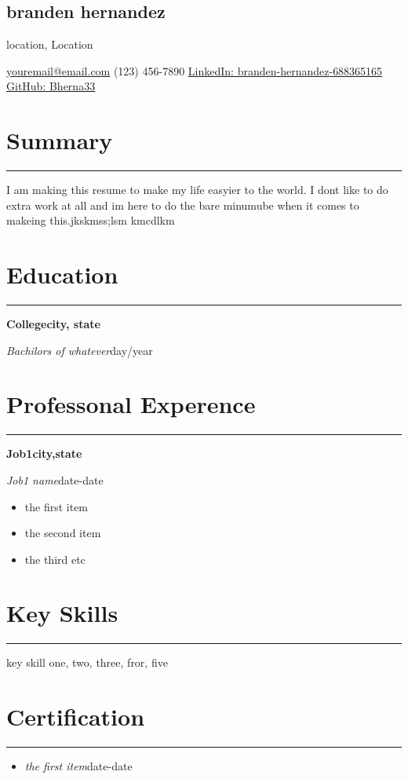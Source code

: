 \documentclass[11pt]{article}%
\begin{document}
%
\normalsize%
%
\setlength\parindent{9pt}%
%
\renewcommand\labelitemi{{-}}%
\pagestyle{empty}%
\renewcommand{\familydefault}{\sfdefault}%
\newcommand{\github}{\textcolor{rgb:red,110;green,84;blue,148}{\faGithubSquare}}%
\newcommand{\linkedIn}{\textcolor{rgb:red,6;green,108;blue,170}{\faLinkedinSquare}}%
\newcommand{\resumesection}[1]{\vspace{-0.5cm}\section*{\color{highlight}#1}\vspace{-0.2cm}\hrule\vspace{0.2cm}}%
\newcommand{\location}[1]{\begin{center}\vspace{-0.1cm}#1\vspace{-0.3cm}\end{center}}%
\newcommand{\contactInfo}[1]{\begin{center}\vspace{-0.1cm}#1\vspace{-0.3cm}\end{center}}%
\newcommand{\name}[1]{\begin{center}\section*{\LARGE \color{highlight}#1}\vspace{-0.8cm}\end{center}}%
\name{branden hernandez}%
\location{location, Location}%
\contactInfo{\href{mailto:email@domain}{youremail@email.com}{ (123) 456{-}7890 }{\href{https://www.linkedin.com/in/branden{-}hernandez{-}688365165/}{LinkedIn: branden{-}hernandez{-}688365165}}{\href{https://github.com/Bherna33}{ GitHub: Bherna33}}}%
\resumesection{Summary}%
I am making this resume to make my life easyier to the world. I dont like to do extra work at all and im here to do the bare minumube when it comes to makeing this.jkskmss;lsm kmcdlkm%
\resumesection{Education}%
\textbf{College}{\textbf{\hfill {city, state}}}%
\par%
\textit{Bachilors of whatever}{\hfill {day/year}}%
\par%
\resumesection{Professonal Experence}%
\textbf{Job1}{\textbf{\hfill{city,state}}}%
\par%
\textit{Job1 name}{\hfill{date{-}date}}%
\begin{itemize}%
\item%
the first item%
\item%
the second item%
\item%
the third etc%
\end{itemize}%
\resumesection{Key Skills}%
key skill one, two, three, fror, five%
\resumesection{Certification}%
\begin{itemize}%
\item%
\textit{the first item}{\hfill{date{-}date}}%
\end{itemize}%
\end{document}
